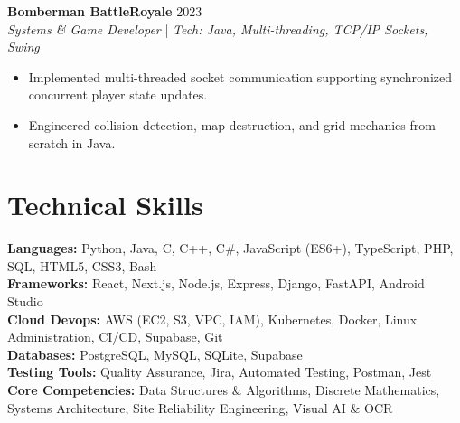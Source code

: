 \documentclass[letterpaper,10pt]{article}
\begin{document}
\vspace{4pt}
\textbf{Bomberman BattleRoyale} \hfill 2023
\\ \textit{Systems \& Game Developer} | \textit{Tech: Java, Multi-threading, TCP/IP Sockets, Swing}
\begin{itemize}
  \item Implemented multi-threaded socket communication supporting synchronized concurrent player state updates.
  \item Engineered collision detection, map destruction, and grid mechanics from scratch in Java.
\end{itemize}
\vspace{4pt}

\section{Technical Skills}
\textbf{Languages:} Python, Java, C, C++, C\#, JavaScript (ES6+), TypeScript, PHP, SQL, HTML5, CSS3, Bash \\
\textbf{Frameworks:} React, Next.js, Node.js, Express, Django, FastAPI, Android Studio \\
\textbf{Cloud Devops:} AWS (EC2, S3, VPC, IAM), Kubernetes, Docker, Linux Administration, CI/CD, Supabase, Git \\
\textbf{Databases:} PostgreSQL, MySQL, SQLite, Supabase \\
\textbf{Testing Tools:} Quality Assurance, Jira, Automated Testing, Postman, Jest \\
\textbf{Core Competencies:} Data Structures \& Algorithms, Discrete Mathematics, Systems Architecture, Site Reliability Engineering, Visual AI \& OCR \\
\end{document}
